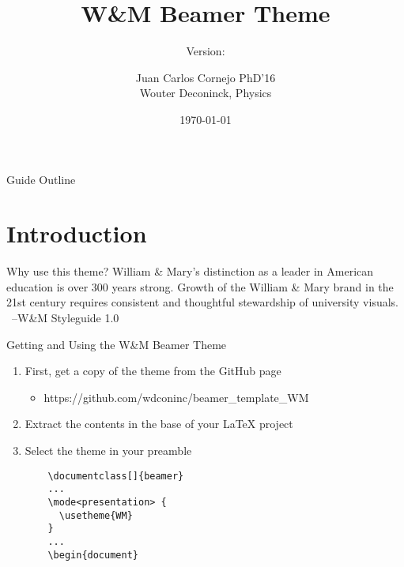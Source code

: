 \documentclass[xcolor=table,compress,professionalfonts,pdfpagelabels]{beamer}
\author{Juan Carlos Cornejo PhD'16 \\ Wouter Deconinck, Physics}
\title{W\&M Beamer Theme}
\subtitle{Version: \thisDocumentVersion}
\institute{William \& Mary}
\date{\today}
\begin{document}
\begin{frame}
  \titlepage
\end{frame}

\begin{frame}{Guide Outline}
  \tableofcontents
\end{frame}

\section{Introduction}
\begin{quoteframe}{Why use this theme?}
William \& Mary's distinction as a leader in American education is over 300 years strong. Growth of the William \& Mary brand in the 21st century requires consistent and thoughtful stewardship of university visuals.\\
\ \hfill--W\&M Styleguide 1.0
\end{quoteframe}

\begin{frame}[fragile]{Getting and Using the W\&M Beamer Theme}
\begin{enumerate}
  \item First, get a copy of the theme from the GitHub page
  \begin{itemize}
    \item https://github.com/wdconinc/beamer\_template\_WM
  \end{itemize}
  \item Extract the contents in the base of your LaTeX project
  \item Select the theme in your preamble
  \begin{verbatim}
    \documentclass[]{beamer}
    ...
    \mode<presentation> {
      \usetheme{WM}
    }
    ...
    \begin{document}
  \end{verbatim}
\end{enumerate}
\end{frame}
\end{document}
